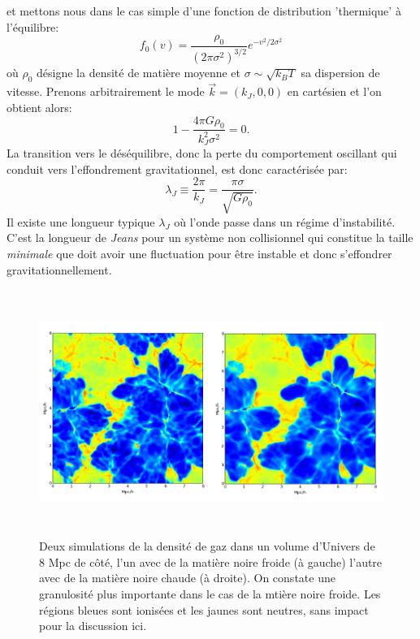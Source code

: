  et mettons nous dans le cas simple d'une fonction de distribution 'thermique' à l'équilibre:
\begin{equation}
f_0(v)=\frac{\rho_0}{(2\pi\sigma^2)^{3/2}}e^{-v^2/2\sigma^2}
\end{equation}
où $\rho_0$ désigne la densité de matière moyenne et $\sigma\sim \sqrt{k_B T}$ sa dispersion de vitesse. Prenons arbitrairement le mode $\vec{k}=(k_J,0,0)$ en cartésien et l'on obtient alors:
\begin{equation}
1-\frac{4\pi G \rho_0}{k_J^2\sigma^2}=0.
\end{equation}
La transition vers le déséquilibre, donc la perte du comportement oscillant qui conduit vers l'effondrement gravitationnel, est donc caractérisée par:
\begin{equation}
\lambda_J\equiv\frac{2\pi}{k_J}=\frac{\pi \sigma}{\sqrt{G\rho_0}}.
\end{equation} 
Il existe une longueur typique $\lambda_J$ où l'onde passe dans un régime d'instabilité. C'est la longueur de \textit{Jeans} pour un système non collisionnel qui constitue la taille \textit{minimale} que doit avoir une fluctuation pour être instable et donc s'effondrer gravitationnellement.

\begin{figure}[htbp]
	\centering
		\includegraphics[height=8cm]{figs/wdm.png}
	\caption[Deux simulations de la densité de gaz dans un volume d'Univers de 8 Mpc de côté]{Deux simulations de la densité de gaz dans un volume d'Univers de 8 Mpc de côté, l'un avec de la matière noire froide (à gauche) l'autre avec de la matière noire chaude (à droite). On constate une granulosité plus importante dans le cas de la mtière noire froide. Les régions bleues sont ionisées et les jaunes sont neutres, sans impact pour la discussion ici.} 
	\label{f:wdm}
\end{figure}

